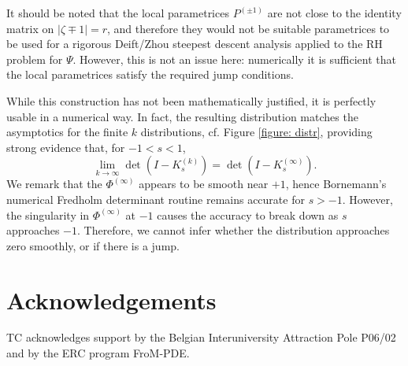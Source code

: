 \documentclass[11pt,fleqn]{article}
\numberwithin{equation}{section}
\begin{document}
It should be noted that the local parametrices $P^{(\pm 1)}$ are not
close to the identity matrix on $|\zeta\mp 1|=r$, and therefore they
would not be suitable parametrices to be used for a rigorous
Deift/Zhou steepest descent analysis \cite{DZ} applied to the RH problem for
$\Psi$. However, this is not an issue here: numerically it is
sufficient that the local parametrices satisfy the required jump
conditions.


    While this construction has not been mathematically justified, it is perfectly usable in a numerical way.
    In fact, the resulting distribution matches the asymptotics for the finite $k$ distributions, cf. Figure
    \ref{figure: distr}, providing strong evidence  that, for $-1 < s < 1$,
%
      $$\lim_{k \rightarrow \infty} \det(I - K_s^{(k)}) = \det(I - K_s^{(\infty)}).$$
%
We remark that the $\Phi^{(\infty)}$ appears to be smooth
near $+1$, hence Bornemann's numerical Fredholm determinant routine remains accurate for $s > -1$.  However, the singularity in $\Phi^{(\infty)}$ at $-1$ causes the accuracy to break down as $s$ approaches $-1$.  Therefore, we cannot infer whether the distribution approaches zero smoothly, or if there is a jump.

\section*{Acknowledgements}
TC acknowledges support by the Belgian Interuniversity
Attraction Pole P06/02 and by the ERC program FroM-PDE.
\end{document}
